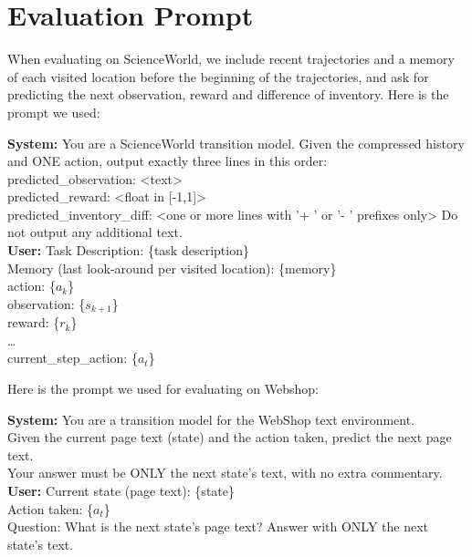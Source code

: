 \documentclass{article}
\theoremstyle{plain}
\theoremstyle{definition}
\theoremstyle{remark}
\begin{document}
\section{Evaluation Prompt}\label{app:prompt_eval}
When evaluating on ScienceWorld, we include recent trajectories and a memory of each visited location before the beginning of the trajectories, and ask for predicting the next observation, reward and difference of inventory. Here is the prompt we used:
\begin{tcolorbox}[
  title=Prompt used for Evaluating on ScienceWorld,
  colback=gray!5,
  colframe=black!50,
  fonttitle=\bfseries
]
\textbf{System:} You are a ScienceWorld transition model. Given the compressed history and ONE action, output exactly three lines in this order:\\
predicted\_observation: <text>\\
predicted\_reward: <float in [-1,1]>\\
predicted\_inventory\_diff: <one or more lines with '+ ' or '- ' prefixes only>
Do not output any additional text. \\[0.5em]
\textbf{User:} Task Description: \{task description\}\\
Memory (last look-around per visited location): \{memory\}\\
action: \{$a_k$\}\\
observation: \{$s_{k+1}$\}\\
reward: \{$r_{k}$\}\\
\ldots \\
current\_step\_action: \{$a_t$\}\\
\end{tcolorbox}

Here is the prompt we used for evaluating on Webshop:
\begin{tcolorbox}[
  title=Prompt used for Evaluating on Webshop,
  colback=gray!5,
  colframe=black!50,
  fonttitle=\bfseries
]
\textbf{System:} You are a transition model for the WebShop text environment. \\
Given the current page text (state) and the action taken, predict the next page text. \\
Your answer must be ONLY the next state's text, with no extra commentary. \\[0.5em]
\textbf{User:} Current state (page text): \{state\} \\
Action taken: \{$a_t$\}\\
Question: What is the next state's page text? Answer with ONLY the next state's text. 
\end{tcolorbox}
\end{document}
